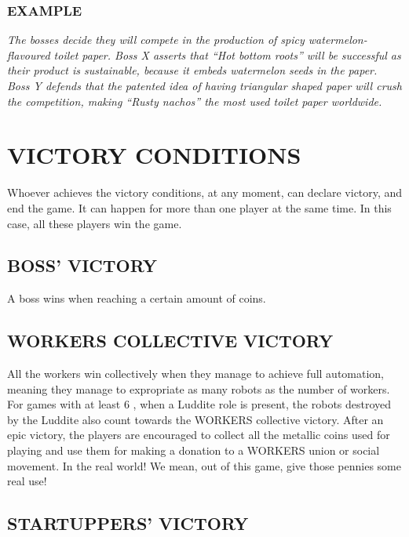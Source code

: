     \subsubsection{EXAMPLE}

        \textit{The bosses decide they will compete in the production of spicy watermelon-flavoured
        toilet paper. Boss X asserts that “Hot bottom roots” will be successful as
        their product is sustainable, because it embeds watermelon seeds in the paper. Boss
        Y defends that the patented idea of having triangular shaped paper will crush the
        competition, making “Rusty nachos” the most used toilet paper worldwide.}



\section{VICTORY CONDITIONS}

    Whoever achieves the victory conditions, at any moment, can declare victory,
    and end the game. It can happen for more than one player at the same time. In
    this case, all these players win the game.

    \subsection{BOSS' VICTORY}
    
        A boss wins when reaching a certain amount of coins.
    
    \subsection{WORKERS COLLECTIVE VICTORY}
    
        All the workers win collectively when they manage to achieve full automation,
        meaning they manage to expropriate as many robots as the number of workers.
        For games with at least 6 \faPeopleGroup, when a Luddite role is present, the robots destroyed
        by the Luddite also count towards the WORKERS collective victory.
        After an epic victory, the players are encouraged to collect all the metallic coins
        used for playing and use them for making a donation to a WORKERS union or social
        movement. In the real world! We mean, out of this game, give those pennies some
        real use!
    
    \subsection{STARTUPPERS' VICTORY}
    
